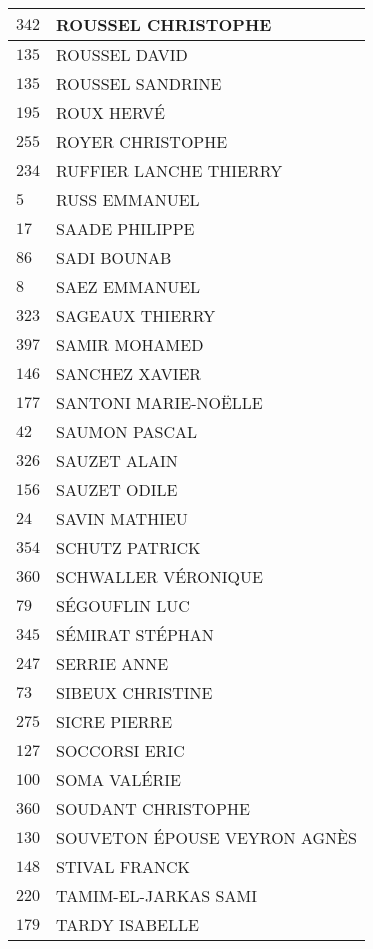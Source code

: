 \begin{xltabular}{\linewidth}{|l|X|}
    \hline
    $342$ & ROUSSEL CHRISTOPHE \\
    \hline
    $135$ & ROUSSEL DAVID \\
    \hline
    $135$ & ROUSSEL SANDRINE \\
    \hline
    $195$ & ROUX HERVÉ \\
    \hline
    $255$ & ROYER CHRISTOPHE \\
    \hline
    $234$ & RUFFIER LANCHE THIERRY \\
    \hline
    $5$ & RUSS EMMANUEL \\
    \hline
    $17$ & SAADE PHILIPPE \\
    \hline
    $86$ & SADI BOUNAB \\
    \hline
    $8$ & SAEZ EMMANUEL \\
    \hline
    $323$ & SAGEAUX THIERRY \\
    \hline
    $397$ & SAMIR MOHAMED \\
    \hline
    $146$ & SANCHEZ XAVIER \\
    \hline
    $177$ & SANTONI MARIE-NOËLLE \\
    \hline
    $42$ & SAUMON PASCAL \\
    \hline
    $326$ & SAUZET ALAIN \\
    \hline
    $156$ & SAUZET ODILE \\
    \hline
    $24$ & SAVIN MATHIEU \\
    \hline
    $354$ & SCHUTZ PATRICK \\
    \hline
    $360$ & SCHWALLER VÉRONIQUE \\
    \hline
    $79$ & SÉGOUFLIN LUC \\
    \hline
    $345$ & SÉMIRAT STÉPHAN \\
    \hline
    $247$ & SERRIE ANNE \\
    \hline
    $73$ & SIBEUX CHRISTINE \\
    \hline
    $275$ & SICRE PIERRE \\
    \hline
    $127$ & SOCCORSI ERIC \\
    \hline
    $100$ & SOMA VALÉRIE \\
    \hline
    $360$ & SOUDANT CHRISTOPHE \\
    \hline
    $130$ & SOUVETON ÉPOUSE VEYRON AGNÈS \\
    \hline
    $148$ & STIVAL FRANCK \\
    \hline
    $220$ & TAMIM-EL-JARKAS SAMI \\
    \hline
    $179$ & TARDY ISABELLE \\

\end{xltabular}
